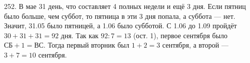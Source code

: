 252. В мае 31 день, что составляет 4 полных недели и ещё 3 дня. Если пятниц было больше, чем суббот, то пятница в эти 3 дня попала, а суббота --- нет. Значит, 31.05 было пятницей, а 1.06 было субботой. С 1.06 до 1.09 пройдёт $30+31+31=92$ дня. Так как $92:7=13$ (ост. 1), первое сентября было $\text{СБ}+1=\text{ВС}.$ Тогда первый вторник был $1+2=3$ сентября, а второй --- $3+7=10$ сентября.\\
